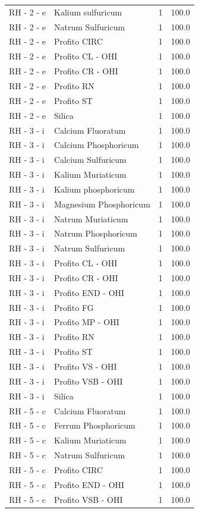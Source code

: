 \documentclass[a4paper,11pt]{article}
\begin{document}
\begin{footnotesize}
\begin{longtable}{p{3.5cm}p{7.5cm}rr}
RH - 2 - e & Kalium sulfuricum & 1 & 100.0 \\
RH - 2 - e & Natrum Sulfuricum & 1 & 100.0 \\
RH - 2 - e & Profito CIRC & 1 & 100.0 \\
RH - 2 - e & Profito CL - OHI & 1 & 100.0 \\
RH - 2 - e & Profito CR - OHI & 1 & 100.0 \\
RH - 2 - e & Profito RN & 1 & 100.0 \\
RH - 2 - e & Profito ST & 1 & 100.0 \\
RH - 2 - e & Silica & 1 & 100.0 \\
RH - 3 - i & Calcium Fluoratum & 1 & 100.0 \\
RH - 3 - i & Calcium Phosphoricum & 1 & 100.0 \\
RH - 3 - i & Calcium Sulfuricum & 1 & 100.0 \\
RH - 3 - i & Kalium Muriaticum & 1 & 100.0 \\
RH - 3 - i & Kalium phosphoricum & 1 & 100.0 \\
RH - 3 - i & Magnesium Phosphoricum & 1 & 100.0 \\
RH - 3 - i & Natrum Muriaticum & 1 & 100.0 \\
RH - 3 - i & Natrum Phosphoricum & 1 & 100.0 \\
RH - 3 - i & Natrum Sulfuricum & 1 & 100.0 \\
RH - 3 - i & Profito CL - OHI & 1 & 100.0 \\
RH - 3 - i & Profito CR - OHI & 1 & 100.0 \\
RH - 3 - i & Profito END - OHI & 1 & 100.0 \\
RH - 3 - i & Profito FG & 1 & 100.0 \\
RH - 3 - i & Profito MP - OHI & 1 & 100.0 \\
RH - 3 - i & Profito RN & 1 & 100.0 \\
RH - 3 - i & Profito ST & 1 & 100.0 \\
RH - 3 - i & Profito VS - OHI & 1 & 100.0 \\
RH - 3 - i & Profito VSB - OHI & 1 & 100.0 \\
RH - 3 - i & Silica & 1 & 100.0 \\
RH - 5 - c & Calcium Fluoratum & 1 & 100.0 \\
RH - 5 - c & Ferrum Phosphoricum & 1 & 100.0 \\
RH - 5 - c & Kalium Muriaticum & 1 & 100.0 \\
RH - 5 - c & Natrum Sulfuricum & 1 & 100.0 \\
RH - 5 - c & Profito CIRC & 1 & 100.0 \\
RH - 5 - c & Profito END - OHI & 1 & 100.0 \\
RH - 5 - c & Profito VSB - OHI & 1 & 100.0 \\
\end{longtable}
\end{footnotesize}
\end{document}
